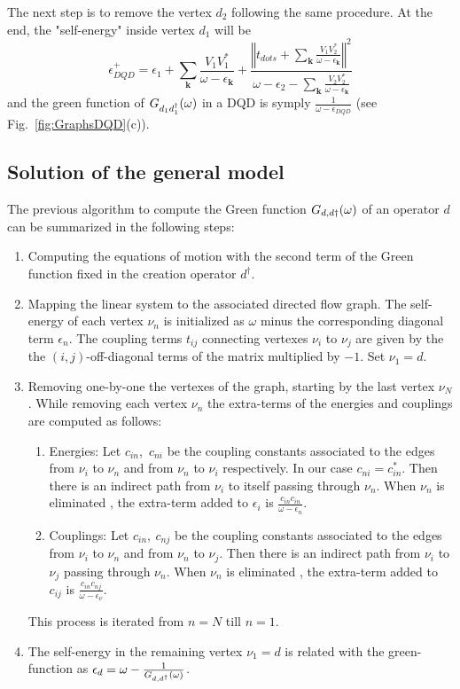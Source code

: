 \documentclass[showpacs,aps,prb,reprint,superscriptaddress]{revtex4-1}
\begin{document}
The next step is to remove the vertex $d_2$ following the same procedure. At the end, the "self-energy" inside  vertex $d_1$ will be
\begin{equation}
    \epsilon^+_{DQD}=\epsilon_{1}+\sum_{\mathbf{k}}\frac{V_{1}V_{1}^{*}}{\omega-\epsilon_{\mathbf{k}}}+\frac{\left\Vert t_{dots}+\sum_{\mathbf{k}}\frac{V_{1}V_{2}^{*}}{\omega-\epsilon_{\mathbf{k}}}\right\Vert ^{2}}{\omega-\epsilon_{2}-\sum_{\mathbf{k}}\frac{V_{2}V_{2}^{*}}{\omega-\epsilon_{\mathbf{k}}}} \label{eq:EnDQD}
\end{equation}
and the green function of $G_{d_1d^\dagger_1}(\omega)$ in a DQD is symply $\frac{1}{\omega -  \epsilon_{DQD}}$ (see Fig.\ \ref{fig:GraphsDQD}(c)).

\subsection{Solution of the general model}

The previous algorithm  to compute the Green function  $G_{d,d\dagger}(\omega)$ of an operator $d$ can be summarized in the following steps:

\begin{enumerate}
    \item Computing the equations of motion with the second term of the Green function fixed in the creation operator $d^\dagger$. 
     \item  Mapping the linear system to the associated directed flow graph. The self-energy of each vertex $\nu_n$ is initialized as $\omega$ minus the corresponding diagonal term $\epsilon_{n}$.  The coupling terms $t_{ij}$ connecting vertexes $\nu_i$ to $\nu_j$ are given by the the $(i,j)$-off-diagonal terms of the matrix multiplied by $-1$. Set $\nu_1 = d$.  
    \item Removing one-by-one the vertexes of the graph, starting by the last vertex $\nu_N$. While removing each vertex $\nu_n$ the extra-terms of the energies and couplings are computed as follows:
      \begin{enumerate}
        \item Energies: Let $c_{in}$,\ $c_{ni}$ be the coupling constants associated to the edges from $\nu_i$ to $\nu_n$  and from $\nu_n$ to $\nu_i$ respectively. In our case $c_{ni} = c_{in}^*$. Then there is an indirect path from $\nu_i$ to itself passing through $\nu_n$. When  $\nu_n$ is eliminated , the extra-term added to $\epsilon_{i}$ is   $\frac{c_{in}c_{in}}{\omega-\epsilon_{n}}$. 
        \item Couplings: Let $c_{in},\ c_{nj}$ be the coupling constants associated to the edges from $\nu_i$ to $\nu_n$  and from $\nu_n$ to $\nu_j$. Then there is an indirect path from $\nu_i$ to $\nu_j$ passing through $\nu_n$. When  $\nu_n$ is eliminated , the extra-term added to $c_{ij}$ is   $\frac{c_{in}c_{nj}}{\omega-\epsilon_{\nu}}$. 
        \end{enumerate}
    \ignorespacesafterend  
    This process is iterated from $n=N$ till $n=1$.
    \item The self-energy in the remaining vertex $\nu_1 = d$ is related with the green-function as $\epsilon_d = \omega -\frac{1}{ G_{d,d^\dagger}(\omega)}$.
\end{enumerate}
    
\end{document}
